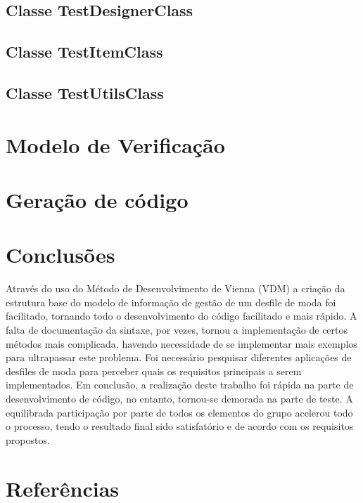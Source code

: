 \documentclass{article}
\begin{document}
\subsection{Classe TestDesignerClass}


\subsection{Classe TestItemClass}


\subsection{Classe TestUtilsClass}


\section{Modelo de Verificação}

\section{Geração de código}

\section{Conclusões}
Através do uso do Método de Desenvolvimento de Vienna (VDM) a criação da estrutura base do modelo de informação de gestão de um desfile de moda foi facilitado, tornando todo o desenvolvimento do código facilitado e mais rápido. A falta de documentação da sintaxe, por vezes, tornou a implementação de certos métodos mais complicada, havendo necessidade de se implementar mais exemplos para ultrapassar este problema.
\newline
Foi necessário pesquisar diferentes aplicações de desfiles de moda para perceber quais os requisitos principais a serem implementados. 
\newline
Em conclusão, a realização deste trabalho foi rápida na parte de desenvolvimento de código, no entanto, tornou-se demorada na parte de teste. A equilibrada participação por parte de todos os elementos do grupo acelerou todo o processo, tendo o resultado final sido satisfatório e de acordo com os requisitos propostos.
\section{Referências}
\end{document}
